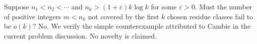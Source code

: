 Suppose $n_1<n_2<\cdots$ and $n_k>(1+\varepsilon)k\log k$ for some $\varepsilon>0$. Must the number of positive integers $m<n_k$ not covered by the first $k$ chosen residue classes fail to be $o(k)$? No. We verify the simple counterexample attributed to Cambie in the current problem discussion. No novelty is claimed.
